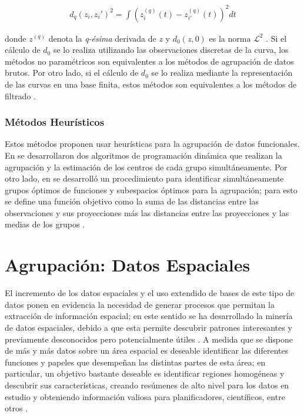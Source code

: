 \documentclass[
]{book}
\begin{document}
\begin{align*}
    d_q(z_i,z_i')^2=\int\left( z_i^{(q)}(t)-z_{i'}^{(q)}(t)\right)^2dt
\end{align*}

donde \(z^{(q)}\) denota la \emph{q-ésima} derivada de \(z\) y \(d_0(z,0)\) es la norma \(\mathcal{L}^2\) \citep{ferraty}. Si el cálculo de \(d_0\) se lo realiza utilizando las observaciones discretas de la curva, los métodos no paramétricos son equivalentes a los métodos de agrupación de datos brutos. Por otro lado, si el cálculo de \(d_0\) se lo realiza mediante la representación de las curvas en una base finita, estos métodos son equivalentes a los métodos de filtrado \citep{Jaque}.

\hypertarget{muxe9todos-heuruxedsticos}{%
\subsubsection*{Métodos Heurísticos}\label{muxe9todos-heuruxedsticos}}

Estos métodos proponen usar heurísticas para la agrupación de datos funcionales. En \citep{herbalife} se desarrollaron dos algoritmos de programación dinámica que realizan la agrupación y la estimación de los centros de cada grupo simultáneamente. Por otro lado, en \citep{yamamoto} se desarrolló un procedimiento para identificar simultáneamente grupos óptimos de funciones y subespacios óptimos para la agrupación; para esto se define una función objetivo como la suma de las distancias entre las observaciones y sus proyecciones más las distancias entre las proyecciones y las medias de los grupos \citep{Jaque}.

\hypertarget{agrupaciuxf3n-datos-espaciales}{%
\section{Agrupación: Datos Espaciales}\label{agrupaciuxf3n-datos-espaciales}}

El incremento de los datos espaciales y el uso extendido de bases de este tipo de datos ponen en evidencia la necesidad de generar procesos que permitan la extracción de información espacial; en este sentido se ha desarrollado la minería de datos espaciales, debido a que esta permite descubrir patrones interesantes y previamente desconocidos pero potencialmente útiles \citep{sumati}. A medida que se dispone de más y más datos sobre un área espacial es deseable identificar las diferentes funciones y papeles que desempeñan las distintas partes de esta área; en particular, un objetivo bastante deseable es identificar regiones homogéneas y descubrir sus características, creando resúmenes de alto nivel para los datos en estudio y obteniendo información valiosa para planificadores, científicos, entre otros \citep{cesario}.
\end{document}
